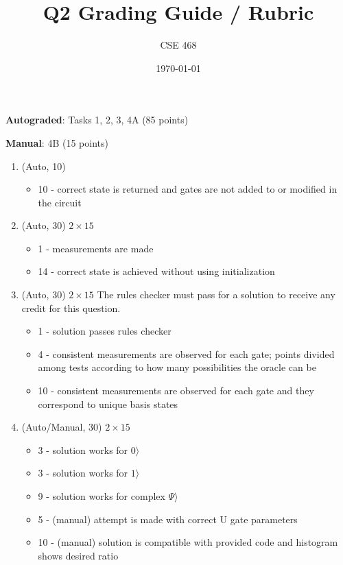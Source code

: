 \documentclass[12pt]{article}
\title{Q2 Grading Guide / Rubric}
\author{CSE 468}
\date{\today}
\begin{document}
\maketitle

\noindent \textbf{Autograded}: Tasks 1, 2, 3, 4A (85 points) 

\noindent \textbf{Manual}: 4B (15 points)

\begin{enumerate}[font=\bfseries]
    \item (Auto, 10)
    \begin{itemize}
        \item 10 - correct state is returned and gates are not added to or modified in the circuit
    \end{itemize}
    \item (Auto, 30) $2\times15$
    \begin{itemize}
        \item 1 - measurements are made
        \item 14 - correct state is achieved without using initialization
    \end{itemize}
    \item (Auto, 30) $2\times15$
    The rules checker must pass for a solution to receive any credit for this question.
    \begin{itemize}
        \item 1 - solution passes rules checker
        \item 4 - consistent measurements are observed for each gate; points divided among tests according to how many possibilities the oracle can be
        \item 10 - consistent measurements are observed for each gate and they correspond to unique basis states
    \end{itemize}
    \item (Auto/Manual, 30) $2\times15$
    \begin{itemize}
        \item 3 - solution works for $
        0\rangle$
        \item 3 - solution works for $
        1\rangle$
        \item 9 - solution works for complex $
        \Psi\rangle$
        \item 5 - (manual) attempt is made with correct U gate parameters
        \item 10 - (manual) solution is compatible with provided code and histogram shows desired ratio
    \end{itemize}
\end{enumerate}
\end{document}
